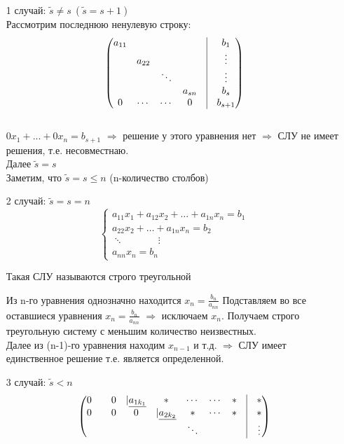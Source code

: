 \documentclass[a4paper, 12pt]{article}
\theoremstyle{definition}
\begin{document}
  \begin{itemize}
    \item[1 случай:]
    $\widetilde{s} \neq s \ (\widetilde{s}=s+1)$ \\ 
    Рассмотрим последнюю ненулевую строку:
    $$\begin{pmatrix}
      a_{11} & \null & \null & \null & \vline & b_1 \\
      \null & a_{22} & \null & \null & \vline & \vdots \\
      \null & \null & \ddots & \null & \vline & \vdots \\
      \null & \null & \null & a_{sn} & \vline & b_s \\
      0 & \cdots & \cdots & 0 & \vline & b_{s+1}
    \end{pmatrix}$$ \\
    $0x_1+...+0x_n=b_{s+1}$ 
    $\Longrightarrow$ решение у этого уравнения нет 
    $\Longrightarrow$ СЛУ не имеет решения, т.е. несовместнаю. \\
    Далее $\widetilde{s}=s$\\
    Заметим, что $\widetilde{s}=s\leq n$ (n-количество столбов)
    \item[2 случай:] $\widetilde{s}=s=n$  
    $$\left\{ \begin{aligned}
      a_{11} x_1 + a_{12} x_2+ \dots + a_{1n} x_n = b_1 \\
      a_{22} x_2 + \dots + a_{1n} x_n = b_2 \\ 
      \ddots \ \ \ \ \ \ \ \ \ \ \ \ \ \ \ \ \vdots \ \\
      a_{nn} x_n = b_n
    \end{aligned}
    \right.$$

    Такая СЛУ называются строго треугольной

    Из n-го уравнения однозначно находится $x_n = \frac{b_n}{a_{nn}}$
    Подставляем во все оставшиеся уравнения $x_n = \frac{b_n}{a_{nn}}$ $\Longrightarrow$ исключаем $x_n$. Получаем строго треугольную систему с меньшим количество неизвестных.  \\
    Далее из (n-1)-го уравнения  находим $x_{n-1}$ и т.д. $\Longrightarrow$ СЛУ имеет единственное решение т.е. является определенной.

    \item[3 случай:] $\widetilde{s}<n$ 
  $$\begin{pmatrix}
    0 & \null & 0 & |\underline{a_{1k_1}} & \ast & \cdots & \cdots & \ast & \vline & \ast  \\
    0 & \null & 0 & 0 & |\underline{a_{2k_2}} & \ast & \cdots & \ast & \vline & \ast \\
    \null & \null & \null & \null & \null & \ddots & \null & \null & \vline & \vdots
  \end{pmatrix}$$ 


\end{itemize}
\end{document}
